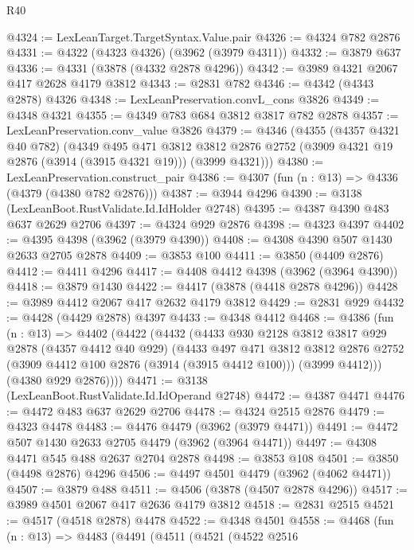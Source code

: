 \begin{lexlean}{R40}
\begin{coremodule}
@4324 := LexLeanTarget.TargetSyntax.Value.pair
@4326 := @4324 @782 @2876
@4331 := @4322 (@4323 @4326) (@3962 (@3979 @4311))
@4332 := @3879 @637
@4336 := @4331 (@3878 (@4332 @2878 @4296))
@4342 := @3989 @4321 @2067 @417 @2628 @4179 @3812
@4343 := @2831 @782
@4346 := @4342 (@4343 @2878) @4326
@4348 := LexLeanPreservation.convL_cons @3826
@4349 := @4348 @4321
@4355 := @4349 @783 @684 @3812 @3817 @782 @2878
@4357 := LexLeanPreservation.conv_value @3826
@4379 := @4346
    (@4355
      (@4357 @4321 @40 @782)
      (@4349
        @495
        @471
        @3812
        @3812
        @2876
        @2752
        (@3909 @4321 @19 @2876 (@3914 (@3915 @4321 @19)))
        (@3999 @4321)))
@4380 := LexLeanPreservation.construct_pair
@4386 := @4307 (fun (n : @13) => @4336 (@4379 (@4380 @782 @2876)))
@4387 := @3944 @4296
@4390 := @3138 (LexLeanBoot.RustValidate.Id.IdHolder @2748)
@4395 := @4387 @4390 @483 @637 @2629 @2706
@4397 := @4324 @929 @2876
@4398 := @4323 @4397
@4402 := @4395 @4398 (@3962 (@3979 @4390))
@4408 := @4308 @4390 @507 @1430 @2633 @2705 @2878
@4409 := @3853 @100
@4411 := @3850 (@4409 @2876)
@4412 := @4411 @4296
@4417 := @4408 @4412 @4398 (@3962 (@3964 @4390))
@4418 := @3879 @1430
@4422 := @4417 (@3878 (@4418 @2878 @4296))
@4428 := @3989 @4412 @2067 @417 @2632 @4179 @3812
@4429 := @2831 @929
@4432 := @4428 (@4429 @2878) @4397
@4433 := @4348 @4412
@4468 := @4386
    (fun (n : @13) =>
    @4402
      (@4422
        (@4432
          (@4433
            @930
            @2128
            @3812
            @3817
            @929
            @2878
            (@4357 @4412 @40 @929)
            (@4433
              @497
              @471
              @3812
              @3812
              @2876
              @2752
              (@3909 @4412 @100 @2876 (@3914 (@3915 @4412 @100)))
              (@3999 @4412)))
          (@4380 @929 @2876))))
@4471 := @3138 (LexLeanBoot.RustValidate.Id.IdOperand @2748)
@4472 := @4387 @4471
@4476 := @4472 @483 @637 @2629 @2706
@4478 := @4324 @2515 @2876
@4479 := @4323 @4478
@4483 := @4476 @4479 (@3962 (@3979 @4471))
@4491 := @4472 @507 @1430 @2633 @2705 @4479 (@3962 (@3964 @4471))
@4497 := @4308 @4471 @545 @488 @2637 @2704 @2878
@4498 := @3853 @108
@4501 := @3850 (@4498 @2876) @4296
@4506 := @4497 @4501 @4479 (@3962 (@4062 @4471))
@4507 := @3879 @488
@4511 := @4506 (@3878 (@4507 @2878 @4296))
@4517 := @3989 @4501 @2067 @417 @2636 @4179 @3812
@4518 := @2831 @2515
@4521 := @4517 (@4518 @2878) @4478
@4522 := @4348 @4501
@4558 := @4468
    (fun (n : @13) =>
    @4483
      (@4491
        (@4511
          (@4521
            (@4522
              @2516

\end{coremodule}
\end{lexlean}

